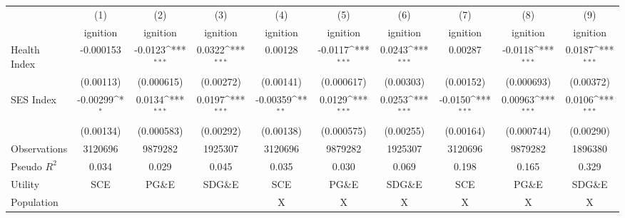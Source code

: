 {
\def\sym#1{\ifmmode^{#1}\else\(^{#1}\)\fi}
\begin{tabular}{l*{9}{c}}
\hline\hline
                    &\multicolumn{1}{c}{(1)}         &\multicolumn{1}{c}{(2)}         &\multicolumn{1}{c}{(3)}         &\multicolumn{1}{c}{(4)}         &\multicolumn{1}{c}{(5)}         &\multicolumn{1}{c}{(6)}         &\multicolumn{1}{c}{(7)}         &\multicolumn{1}{c}{(8)}         &\multicolumn{1}{c}{(9)}         \\
                    &    ignition         &    ignition         &    ignition         &    ignition         &    ignition         &    ignition         &    ignition         &    ignition         &    ignition         \\
\hline
Health Index        &   -0.000153         &     -0.0123\sym{***}&      0.0322\sym{***}&     0.00128         &     -0.0117\sym{***}&      0.0243\sym{***}&     0.00287         &     -0.0118\sym{***}&      0.0187\sym{***}\\
                    &   (0.00113)         &  (0.000615)         &   (0.00272)         &   (0.00141)         &  (0.000617)         &   (0.00303)         &   (0.00152)         &  (0.000693)         &   (0.00372)         \\
[1em]
SES Index           &    -0.00299\sym{*}  &      0.0134\sym{***}&      0.0197\sym{***}&    -0.00359\sym{**} &      0.0129\sym{***}&      0.0253\sym{***}&     -0.0150\sym{***}&     0.00963\sym{***}&      0.0106\sym{***}\\
                    &   (0.00134)         &  (0.000583)         &   (0.00292)         &   (0.00138)         &  (0.000575)         &   (0.00255)         &   (0.00164)         &  (0.000744)         &   (0.00290)         \\
\hline
Observations        &     3120696         &     9879282         &     1925307         &     3120696         &     9879282         &     1925307         &     3120696         &     9879282         &     1896380         \\
Pseudo \(R^{2}\)    &       0.034         &       0.029         &       0.045         &       0.035         &       0.030         &       0.069         &       0.198         &       0.165         &       0.329         \\
Utility             &         SCE         &       PG\&E         &      SDG\&E         &         SCE         &       PG\&E         &      SDG\&E         &         SCE         &       PG\&E         &      SDG\&E         \\
Population          &                     &                     &                     &           X         &           X         &           X         &           X         &           X         &           X         \\

\end{tabular}}
